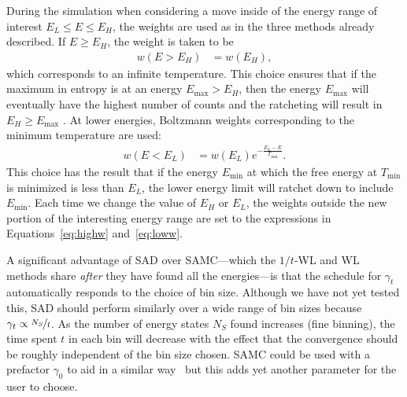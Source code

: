 \documentclass[letterpaper,twocolumn,amsmath,amssymb,pre,aps,10pt]{revtex4-1}
\begin{document}
During the simulation when considering a move inside of the energy
range of interest $E_L \le E \le E_H$, the weights are used as in the
three methods already described.  If $E\ge E_H$, the weight is taken
to be
\begin{align}\label{eq:highw}
  w(E>E_H) &= w(E_H),
\end{align}
which corresponds to an infinite temperature.  This choice ensures
that if the maximum in entropy is at an energy $E_{\max}>E_H$, then
the energy $E_{\max}$ will eventually have the highest number of
counts and the ratcheting will result in $E_H\ge E_{\max}$ .  At lower
energies, Boltzmann weights corresponding to the minimum temperature
are used:
\begin{align}\label{eq:loww}
  w(E<E_L) &= w(E_L)e^{-\frac{E_L-E}{T_{\min}}}.
\end{align}
This choice has the result that if the energy $E_{\min}$ at which the free
energy at $T_{\min}$ is minimized is less than $E_L$, the lower energy
limit will ratchet down to include $E_{\min}$.
Each time we change the value of $E_H$ or $E_L$, the weights outside the
new portion of the interesting energy range are set to the expressions
in Equations~\ref{eq:highw} and~\ref{eq:loww}.


A significant advantage of SAD over SAMC---which the $1/t$-WL and WL
methods share \emph{after} they have found all the energies---is that
the schedule for $\gamma_t$ automatically responds to the choice of bin
size. Although we have not yet tested this,
SAD should perform similarly over a wide range of bin sizes
because $\gamma_t \propto \nicefrac{N_S}{t}$.  As the number of energy
states $N_S$ found increases (fine binning), the time spent $t$ in
each bin will decrease with the effect that the convergence should be
roughly independent of the bin size chosen.  SAMC could be used with a
prefactor $\gamma_0$ to aid in a similar
way~\cite{werlich2015stochastic} but this adds yet another parameter
for the user to choose.
\end{document}

